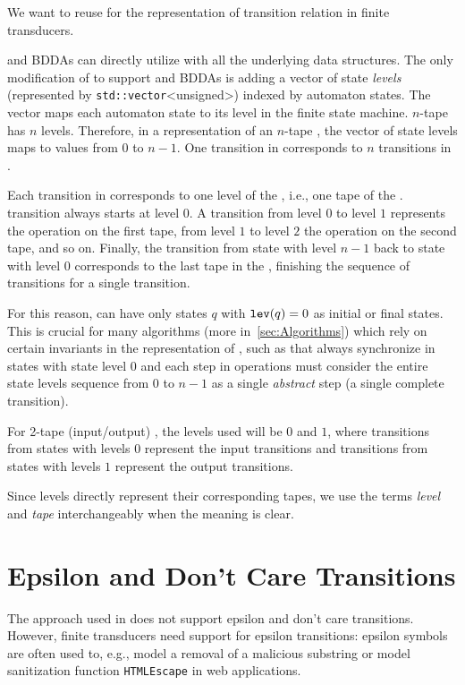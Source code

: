 We want to reuse \deltastruct for the representation of transition relation in finite transducers.

\nfts and BDDAs can directly utilize \nfaClass with all the underlying data structures.
The only modification of \nfaClass to support \nfts and BDDAs is adding a vector of state \emph{levels} (represented by \texttt{std::vector}<unsigned>) indexed by automaton states. The vector maps each automaton state to its level in the finite state machine.
$n$-tape \nft has $n$ levels.
Therefore, in a representation of an $n$-tape \nft, the vector of state levels maps to values from $0$ to $n-1$.
One transition in \nft corresponds to $n$ transitions in \nfaClass.

Each transition in \nfaClass corresponds to one level of the \nft, i.e., one tape of the \nft.
\nft transition always starts at level $0$.
A transition from level $0$ to level $1$ represents the operation on the first \nft tape, from level $1$ to level $2$ the operation on the second \nft tape, and so on.
Finally, the transition from state with level $n-1$ back to state with level $0$ corresponds to the last tape in the \nft, finishing the sequence of \nfa transitions for a single \nft transition.

For this reason, \nfts can have only states $q$ with $\texttt{lev}(q) = 0$ as initial or final states.
This is crucial for many algorithms (more in~\ref{sec:Algorithms}) which rely on certain invariants in the representation of \nfts, such as that \nfts always synchronize in states with state level $0$ and each step in operations must consider the entire state levels sequence from $0$ to $n-1$ as a single \emph{abstract} step (a single complete \nft transition).

For 2-tape (input/output) \nft, the levels used will be $0$ and $1$, where transitions from states with levels $0$ represent the input transitions and transitions from states with levels $1$ represent the output transitions.

Since levels directly represent their corresponding tapes, we use the terms \emph{level} and \emph{tape} interchangeably when the meaning is clear.

\section{Epsilon and Don't Care Transitions}
\label{sec:epsilon_dont_care}
The approach used in \lash does not support epsilon and don't care transitions.
However, finite transducers need support for epsilon transitions: epsilon symbols are often used to, e.g., model a removal of a malicious substring or model sanitization function \texttt{HTMLEscape} in web applications.

